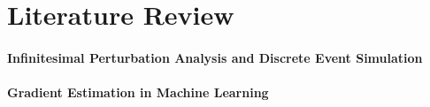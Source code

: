 \section{Literature Review}
\label{section:lit-review}

\paragraph{Infinitesimal Perturbation Analysis and Discrete Event Simulation}

\paragraph{Gradient Estimation in Machine Learning}

\paragraph{}
